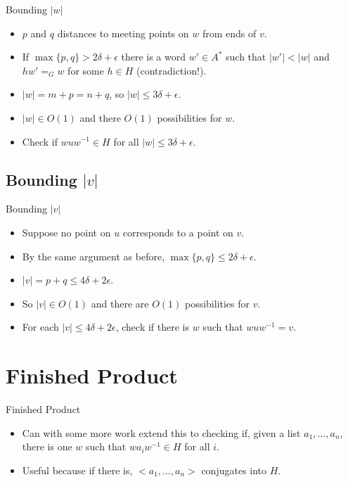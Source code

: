 \documentclass{beamer}
\begin{document}
\begin{frame}{Bounding $|w|$}
  \begin{itemize}
	\item $p$ and $q$ distances to meeting points on $w$ from ends of $v$.
	\only<1-2,4->{
	\begin{figure}
	
	\end{figure}
	}
	\only<3>{
	\begin{figure}
	
	\end{figure}
	}
	\pause
	\item If $\max\{p,q\} > 2\delta + \epsilon$ there is a word $w' \in A^*$ such that $|w'| < |w|$ and $hw' =_G w$ for some $h \in H$ (contradiction!).
	\pause
	\pause
	\item $|w| = m + p = n + q$, so $|w| \le 3\delta + \epsilon$.
	\pause
	\item $|w| \in O(1)$ and there $O(1)$ possibilities for $w$.
	\item Check if $wuw^{-1} \in H$ for all $|w| \le 3\delta + \epsilon$.
  \end{itemize}
\end{frame}

\subsection{Bounding $|v|$}

\begin{frame}{Bounding $|v|$}
  \begin{itemize}
    \item Suppose no point on $u$ corresponds to a point on $v$.
	\begin{figure}
	
	\end{figure}
	\pause
	\item By the same argument as before, $\max\{p,q\} \le 2\delta + \epsilon$.
	\item $|v| = p + q \le 4\delta + 2\epsilon$.
	\pause
	\item So $|v| \in O(1)$ and there are $O(1)$ possibilities for $v$.
	\item For each $|v| \le 4\delta + 2\epsilon$, check if there is $w$ such that $wuw^{-1} = v$.
  \end{itemize}
\end{frame}

\section{Finished Product}

\begin{frame}{Finished Product}
  \begin{itemize}
    \item Can with some more work extend this to checking if, given a list $a_1, \ldots, a_n$, there is one $w$ such that $wa_iw^{-1} \in H$ for all $i$.
	\pause
    \item Useful because if there is, $<\!\!a_1, \ldots, a_n\!\!>$ conjugates into $H$.
  \end{itemize}
\end{frame}
  
\end{document}
